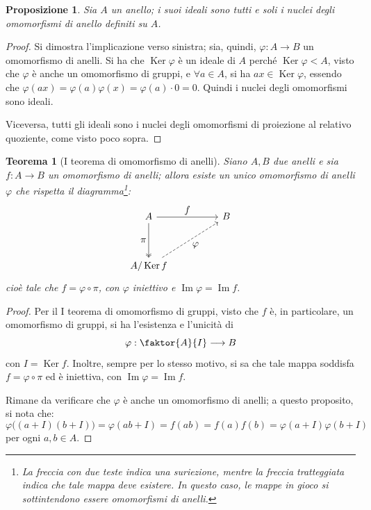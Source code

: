 \documentclass[11pt]{article}
\theoremstyle{style}
\newtheorem{prop}{Proposizione}[section]
\newtheorem{teorema}{Teorema}[section]
\numberwithin{equation}{subsection}
\begin{document}
\begin{prop}
	Sia $A$ un anello; i suoi ideali sono tutti e soli i nuclei degli omomorfismi di anello definiti su $A$.
\end{prop}
	\begin{proof}
		Si dimostra l'implicazione verso sinistra; sia, quindi, $\varphi  : A \to B$ un omomorfismo di anelli.
		Si ha che $\operatorname{Ker} \varphi $ \`e un ideale di $A$ perch\'e $\operatorname{Ker} \varphi <  A$, visto che $\varphi $ \`e anche un omomorfismo di gruppi, e $\forall a \in A$, si ha $ax \in \operatorname{Ker} \varphi $, essendo che $\varphi (ax) = \varphi (a) \varphi (x) = \varphi (a) \cdot 0 = 0$.
		Quindi i nuclei degli omomorfismi sono ideali.

		Viceversa, tutti gli ideali sono i nuclei degli omomorfismi di proiezione al relativo quoziente, come visto poco sopra.
	\end{proof}
\begin{teorema}
	[I teorema di omomorfismo di anelli]
	Siano $A,B$ due anelli e sia $f: A \to B$ un omomorfismo di anelli; allora esiste un unico omomorfismo di anelli $\varphi $ che rispetta il diagramma\footnote{La freccia con due teste indica una suriezione, mentre la freccia tratteggiata indica che tale mappa deve esistere. In questo caso, le mappe in gioco si sottintendono essere omomorfismi di anelli.}:
\[
\begin{tikzcd}
	A & & B\\
	\\
	A / \operatorname{Ker} f
	\arrow[from=1-1,to=1-3,"\displaystyle f"]
	\arrow[from=1-1,to=3-1,"\displaystyle \pi"',two heads]
	\arrow[from=3-1,to=1-3,"\displaystyle \varphi "',dashed]
\end{tikzcd}
\] 
	cio\`e tale che $f = \varphi \circ \pi$, con $\varphi $ iniettivo e $\operatorname{Im} \varphi  = \operatorname{Im} f$.
\end{teorema}
	\begin{proof}
		Per il I teorema di omomorfismo di gruppi, visto che $f$ \`e, in particolare, un omomorfismo di gruppi, si ha l'esistenza e l'unicit\`a di 
		\[
		\varphi  : \faktor{A}{I} \longrightarrow B
		\] 
		con $I = \operatorname{Ker} f$.
		Inoltre, sempre per lo stesso motivo, si sa che tale mappa soddisfa $f = \varphi  \circ \pi$ ed \`e iniettiva, con $\operatorname{Im} \varphi = \operatorname{Im} f$.
		
		Rimane da verificare che $\varphi $ \`e anche un omomorfismo di anelli; a questo proposito, si nota che:
		\[
			\varphi \big((a+I)(b+I)\big)=\varphi (ab + I) = f(ab) =f(a)f(b) = \varphi (a+I) \varphi (b+I)
		\] 
		per ogni $a,b \in A$.
	\end{proof}
\end{document}
